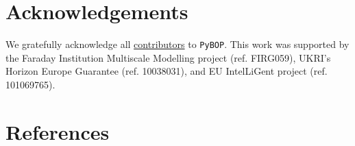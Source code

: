 \documentclass[
]{article}
\begin{document}
\section{Acknowledgements}\label{acknowledgements}

We gratefully acknowledge all
\href{https://github.com/pybop-team/PyBOP?tab=readme-ov-file\#contributors-}{contributors}
to \texttt{PyBOP}. This work was supported by the Faraday Institution
Multiscale Modelling project (ref. FIRG059), UKRI's Horizon Europe
Guarantee (ref. 10038031), and EU IntelLiGent project (ref. 101069765).

\section*{References}\label{references}
\end{document}
